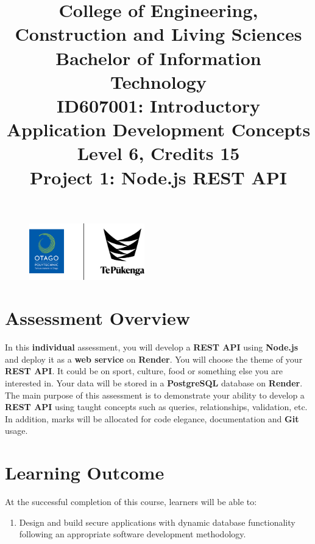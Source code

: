 \documentclass{article}
\author{}
\begin{document}
\begin{figure}
	\centering
	\includegraphics[width=50mm]{../img/logo.png}
\end{figure}

\title{College of Engineering, Construction and Living Sciences\\Bachelor of Information Technology\\ID607001: Introductory Application Development Concepts\\Level 6, Credits 15\\\textbf{Project 1: Node.js REST API}}
\date{}
\maketitle

\section*{Assessment Overview}
In this \textbf{individual} assessment, you will develop a \textbf{REST API} using \textbf{Node.js} and deploy it as a \textbf{web service} on \textbf{Render}. You will choose the theme of your \textbf{REST API}. It could be on sport, culture, food or something else you are interested in. Your data will be stored in a \textbf{PostgreSQL} database on \textbf{Render}. The main purpose of this assessment is to demonstrate your ability to develop a \textbf{REST API} using taught concepts such as queries, relationships, validation, etc. In addition, marks will be allocated for code elegance, documentation and \textbf{Git} usage.

\section*{Learning Outcome}
At the successful completion of this course, learners will be able to:
\begin{enumerate}
	\item Design and build secure applications with dynamic database functionality following an appropriate software development methodology.
\end{enumerate}
\end{document}
